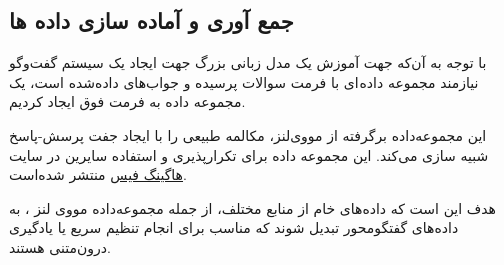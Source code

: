 \subsection{جمع آوری و آماده سازی داده ها}

با توجه به آن‌که جهت آموزش یک مدل زبانی بزرگ جهت ایجاد یک سیستم گفت‌وگو نیازمند مجموعه داده ای با فرمت سوالات پرسیده و جواب‌های داده‌شده است، یک مجموعه داده به فرمت فوق ایجاد کردیم.

این مجموعه‌داده برگرفته از مووی‌لنز، مکالمه طبیعی را با ایجاد جفت پرسش-پاسخ شبیه سازی می‌کند. این مجموعه داده برای تکرارپذیری و استفاده سایرین در سایت 
\href{https://huggingface.co/datasets/Arefyzd8/MoiveLensDiscussionRecommendationsPrompts}{هاگینگ فیس}
 منتشر شده‌است. 

\label{chap:dataset}
هدف این است که داده‌های خام از منابع مختلف، از جمله مجموعه‌داده 
مووی لنز%
، به داده‌های گفتگو‌محور تبدیل شوند که مناسب برای انجام تنظیم سریع یا یادگیری درون‌متنی%
 هستند.
